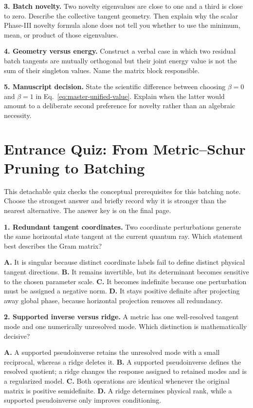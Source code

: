 \documentclass[10pt,twocolumn]{article}
\begin{document}
\textbf{3. Batch novelty.}
Two novelty eigenvalues are close to one and a third is close to zero. Describe
the collective tangent geometry. Then explain why the scalar Phase-III novelty
formula alone does not tell you whether to use the minimum, mean, or product of
those eigenvalues.

\textbf{4. Geometry versus energy.}
Construct a verbal case in which two residual batch tangents are mutually
orthogonal but their joint energy value is not the sum of their singleton
values. Name the matrix block responsible.

\textbf{5. Manuscript decision.}
State the scientific difference between choosing \(\beta=0\) and \(\beta=1\) in
Eq.~\eqref{eq:master-unified-value}. Explain when the latter would amount to a
deliberate second preference for novelty rather than an algebraic necessity.

\clearpage
\section*{Entrance Quiz: From Metric--Schur Pruning to Batching}

This detachable quiz checks the conceptual prerequisites for this batching
note. Choose the strongest answer and briefly record why it is stronger than
the nearest alternative. The answer key is on the final page.

\textbf{1. Redundant tangent coordinates.}
Two coordinate perturbations generate the same horizontal state tangent at the
current quantum ray. Which statement best describes the Gram matrix?

\textbf{A.} It is singular because distinct coordinate labels fail to define
distinct physical tangent directions.\quad
\textbf{B.} It remains invertible, but its determinant becomes sensitive to
the chosen parameter scale.\quad
\textbf{C.} It becomes indefinite because one perturbation must be assigned a
negative norm.\quad
\textbf{D.} It stays positive definite after projecting away global phase,
because horizontal projection removes all redundancy.

\textbf{2. Supported inverse versus ridge.}
A metric has one well-resolved tangent mode and one numerically unresolved
mode. Which distinction is mathematically decisive?

\textbf{A.} A supported pseudoinverse retains the unresolved mode with a small
reciprocal, whereas a ridge deletes it.\quad
\textbf{B.} A supported pseudoinverse defines the resolved quotient; a ridge
changes the response assigned to retained modes and is a regularized model.\quad
\textbf{C.} Both operations are identical whenever the original matrix is
positive semidefinite.\quad
\textbf{D.} A ridge determines physical rank, while a supported pseudoinverse
only improves conditioning.
\end{document}
